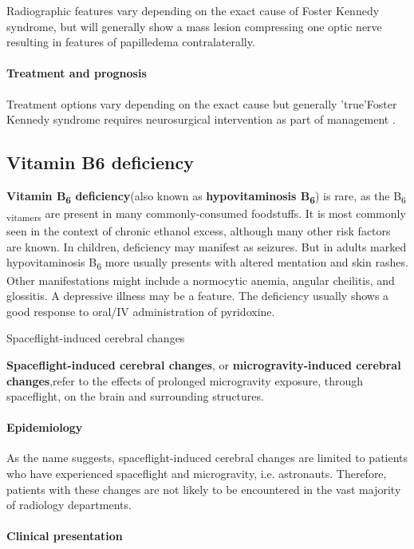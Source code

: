Radiographic features vary depending on the exact cause of Foster Kennedy syndrome, but will generally show a mass lesion compressing one optic nerve resulting in features of papilledema contralaterally.


\paragraph{Treatment and prognosis}

Treatment options vary depending on the exact cause but generally 'true'Foster Kennedy syndrome requires neurosurgical intervention as part of management .

\subsection{Vitamin B6 deficiency}

\textbf{Vitamin B\textsubscript{6} deficiency}(also known as \textbf{hypovitaminosis B\textsubscript{6}}) is rare, as the B\textsubscript{6 vitamers} are present in many commonly-consumed foodstuffs. It is most commonly seen in the context of chronic ethanol excess, although many other risk factors are known. In children, deficiency may manifest as seizures. But in adults marked hypovitaminosis B\textsubscript{6} more usually presents with altered mentation and skin rashes. Other manifestations might include a normocytic anemia, angular cheilitis, and glossitis. A depressive illness may be a feature. The deficiency usually shows a good response to oral/IV administration of pyridoxine.

Spaceflight-induced cerebral changes

\textbf{Spaceflight-induced cerebral changes}, or \textbf{microgravity-induced cerebral changes},refer to the effects of prolonged microgravity exposure, through spaceflight, on the brain and surrounding structures.

\paragraph{Epidemiology}

As the name suggests, spaceflight-induced cerebral changes are limited to patients who have experienced spaceflight and microgravity, i.e. astronauts. Therefore, patients with these changes are not likely to be encountered in the vast majority of radiology departments.

\paragraph{Clinical presentation}

